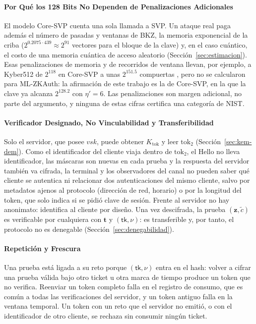 \paragraph{Por Qué los 128 Bits No Dependen de Penalizaciones Adicionales}
El modelo Core-SVP cuenta una sola llamada a SVP. Un ataque real paga además el número de pasadas y ventanas de BKZ, la memoria exponencial de la criba ($2^{0.2075 \cdot 439} \approx 2^{91}$ vectores para el bloque de la clave) y, en el caso cuántico, el costo de una memoria cuántica de acceso aleatorio (Sección~\ref{sec:estimacion}). Esas penalizaciones de memoria y de recorridos de ventana llevan, por ejemplo, a Kyber512 de $2^{118}$ en Core-SVP a unas $2^{151.5}$ compuertas \cite{avanzi2021kyber}, pero no se calcularon para ML-ZKAuth: la afirmación de este trabajo es la de Core-SVP, en la que la clave ya alcanza $2^{128.2}$ con $\eta' = 6$. Las penalizaciones son margen adicional, no parte del argumento, y ninguna de estas cifras certifica una categoría de NIST.

\paragraph{Verificador Designado, No Vinculabilidad y Transferibilidad}
Solo el servidor, que posee $vsk$, puede obtener $K_{\text{tok}}$ y leer $\text{tok}_2$ (Sección~\ref{sec:kem-dem}). Como el identificador del cliente viaja dentro de $\text{tok}_2$, el \textsf{Hello} no lleva identificador, las máscaras son nuevas en cada prueba y la respuesta del servidor también va cifrada, la terminal y los observadores del canal no pueden saber qué cliente se autentica ni relacionar dos autenticaciones del mismo cliente, salvo por metadatos ajenos al protocolo (dirección de red, horario) o por la longitud del token, que solo indica si se pidió clave de sesión. Frente al servidor no hay anonimato: identifica al cliente por diseño. Una vez descifrada, la prueba $(\mathbf{z}, \tilde{c})$ es verificable por cualquiera con $\mathbf{t}$ y $(\mathsf{tk}, \nu)$: es transferible y, por tanto, el protocolo no es denegable (Sección~\ref{sec:denegabilidad}).

\paragraph{Repetición y Frescura}
Una prueba está ligada a su reto porque $(\mathsf{tk}, \nu)$ entra en el hash: volver a cifrar una prueba válida bajo otro ticket u otra marca de tiempo produce un token que no verifica. Reenviar un token completo falla en el registro de consumo, que es común a todas las verificaciones del servidor, y un token antiguo falla en la ventana temporal. Un token con un reto que el servidor no emitió, o con el identificador de otro cliente, se rechaza sin consumir ningún ticket.

